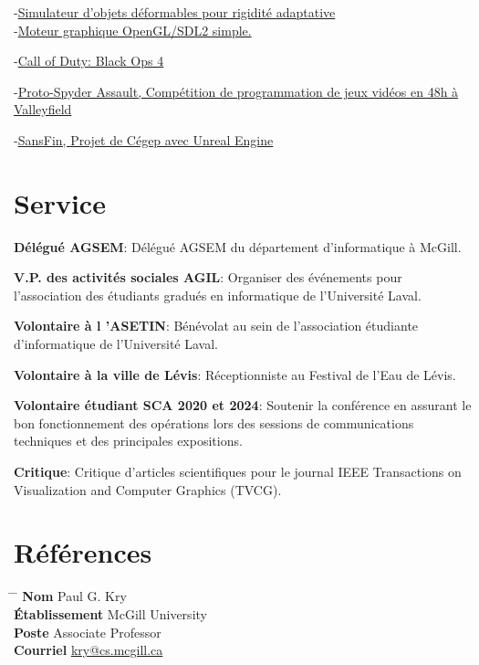 \documentclass[10pt]{article} %
\begin{document}
{
-\href{https://github.com/AlexandreMercierAubin/AdaptiveRigidification2022}{Simulateur d'objets déformables pour rigidité adaptative}\\
-\href{https://github.com/AlexandreMercierAubin/ComputerGraphics}{Moteur graphique OpenGL/SDL2 simple.}\\

}

{
-\href{https://www.callofduty.com/ca/en/blackops4}{Call of Duty: Black Ops 4}

-\href{https://youtu.be/qJjy8b0kuSY}{Proto-Spyder Assault, Compétition de programmation de jeux vidéos en 48h à Valleyfield}

-\href{https://youtu.be/s6vr07Nt1IY}{SansFin, Projet de Cégep avec Unreal Engine}
}

\section{Service}
\textbf{Délégué AGSEM}: Délégué AGSEM du département d'informatique à McGill.

\noindent\textbf{V.P. des activités sociales AGIL}: Organiser des événements pour l'association des étudiants gradués en informatique de l'Université Laval.

\noindent\textbf{Volontaire à l 'ASETIN}: Bénévolat au sein de l'association étudiante d'informatique de l'Université Laval.

\noindent\textbf{Volontaire à la ville de Lévis}: Réceptionniste au Festival de l'Eau de Lévis.

\noindent\textbf{Volontaire étudiant SCA 2020 et 2024}: Soutenir la conférence en assurant le bon fonctionnement des opérations lors des
sessions de communications techniques et des principales expositions.

\noindent\textbf{Critique}: Critique d'articles scientifiques pour le journal IEEE Transactions on Visualization and Computer Graphics (TVCG).

\section{Références}

\parbox{0.5\textwidth}{
\begin{tabbing}
\hspace{2.75cm} \= \hspace{4cm} \= \kill
{\bf Nom} \> Paul G. Kry\\ 
{\bf Établissement} \> McGill University\\ 
{\bf Poste} \> Associate Professor \\ 
{\bf Courriel} \> \href{mailto:kry@cs.mcgill.ca}{kry@cs.mcgill.ca}
\end{tabbing}}
\end{document}
